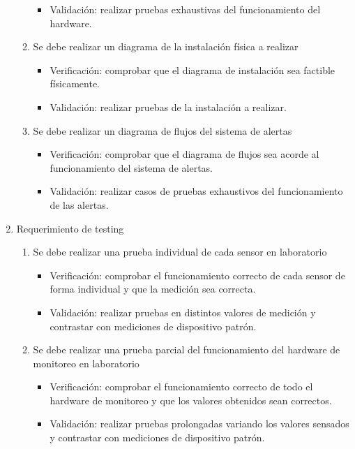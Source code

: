 \documentclass[
11pt, %
]{charter}
\begin{document}
\begin{enumerate}
\begin{enumerate}
\begin{itemize}
				\item Validación: realizar pruebas exhaustivas del funcionamiento del hardware.
			\end{itemize}
			\item Se debe realizar un diagrama de la instalación física a realizar
			\begin{itemize}
				\item Verificación: comprobar que el diagrama de instalación sea factible físicamente.
				\item Validación: realizar pruebas de la instalación a realizar.
			\end{itemize}
			\item Se debe realizar un diagrama de flujos del sistema de alertas
			\begin{itemize}
				\item Verificación: comprobar que el diagrama de flujos sea acorde al funcionamiento del sistema de alertas.
				\item Validación: realizar casos de pruebas exhaustivos del funcionamiento de las alertas.
			\end{itemize}
		\end{enumerate}
	\item Requerimiento de testing
		\begin{enumerate}		
			\item Se debe realizar una prueba individual de cada sensor en laboratorio
			\begin{itemize}
				\item Verificación: comprobar el funcionamiento correcto de cada sensor de forma individual y que la medición sea correcta.
				\item Validación: realizar pruebas en distintos valores de medición y contrastar con mediciones de dispositivo patrón.
			\end{itemize}
			\item Se debe realizar una prueba parcial del funcionamiento del hardware de monitoreo en laboratorio
			\begin{itemize}
				\item Verificación: comprobar el funcionamiento correcto de todo el hardware de monitoreo y que los valores obtenidos sean correctos.
				\item Validación: realizar pruebas prolongadas variando los valores sensados y contrastar con mediciones de dispositivo patrón.
			\end{itemize}

\pagebreak


\end{enumerate}
\end{enumerate}
\end{document}
